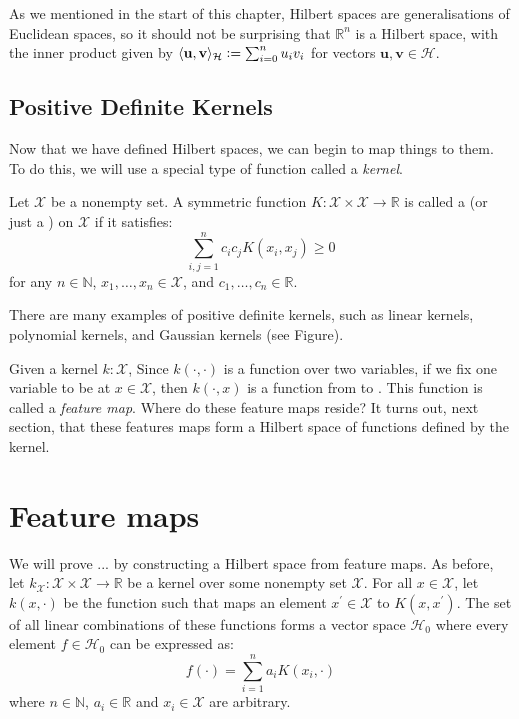 As we mentioned in the start of this chapter, Hilbert spaces are generalisations of Euclidean spaces, so it should not be surprising that $\mathbb{R}^n$ is a Hilbert space, with the inner product given by $\langle\mathbf{u}, \mathbf{v}\rangle_\mathcal{H} \vcentcolon= \sum_{i=0}^n u_i v_i$ for vectors $\mathbf{u}, \mathbf{v} \in \mathcal{H}$. 

\subsection{Positive Definite Kernels}
Now that we have defined Hilbert spaces, we can begin to map things to them. To do this, we will use a special type of function called a \emph{kernel}.
%
\begin{definition}
Let $\mathcal{X}$ be a nonempty set. A symmetric function $K : \mathcal{X} \times \mathcal{X} \to \mathbb{R}$ is called a  (or just a ) on $\mathcal{X}$ if it satisfies:
\begin{equation}
	\sum_{i,j=1}^n c_i c_j K(x_i, x_j) \geq 0
\end{equation}
for any $n \in \mathbb{N}$, $x_1, \dots, x_n \in \mathcal{X}$, and $c_1, \dots, c_n \in \mathbb{R}$.
\end{definition}
%
There are many examples of positive definite kernels, such as linear kernels, polynomial kernels, and Gaussian kernels (see Figure).

Given a kernel $k : \mathcal{X}$,  Since $k(\cdot, \cdot)$ is a function over two variables, if we fix one variable to be at $x \in \mathcal{X}$, then $k(\cdot, x)$ is a function from to . This function is called a \emph{feature map}. Where do these feature maps reside? It turns out, next section, that these features maps form a Hilbert space of functions defined by the kernel.

\section{Feature maps}
We will prove ... by constructing a Hilbert space from feature maps. As before, let $k_\mathcal{X} : \mathcal{X} \times \mathcal{X} \to \mathbb{R}$ be a kernel over some nonempty set $\mathcal{X}$. For all $x \in \mathcal{X}$, let $k(x, \cdot)$ be the function such that maps an element $x^\prime \in \mathcal{X}$ to $K(x, x^\prime)$. The set of all linear combinations of these functions forms a vector space $\mathcal{H}_0$ where every element $f \in \mathcal{H}_0$ can be expressed as:
%
\begin{equation}
  f(\cdot) = \sum_{i=1}^n a_i K(x_i, \cdot)
\end{equation}
%
where $n \in \mathbb{N}$, $a_i \in \mathbb{R}$ and $x_i \in \mathcal{X}$ are arbitrary.

